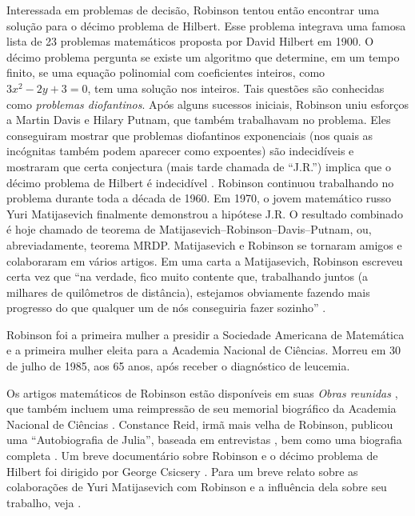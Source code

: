 \documentclass[../../../include/open-logic-section]{subfiles}
\begin{document}
Interessada em problemas de decisão, Robinson tentou então encontrar
uma solução para o décimo problema de Hilbert. Esse problema integrava
uma famosa lista de 23 problemas matemáticos proposta por David
Hilbert em 1900. O décimo problema pergunta se existe um algoritmo que
determine, em um tempo finito, se uma equação polinomial com
coeficientes inteiros, como $3x^2 - 2y +3 = 0$, tem uma solução nos
inteiros. Tais questões são conhecidas como \emph{problemas
diofantinos}. Após alguns sucessos iniciais, Robinson uniu esforços a
Martin Davis e Hilary Putnam, que também trabalhavam no problema. Eles
conseguiram mostrar que problemas diofantinos exponenciais (nos quais
as incógnitas também podem aparecer como expoentes) são indecidíveis
e mostraram que certa conjectura (mais tarde chamada de ``J.R.'')
implica que o décimo problema de Hilbert é indecidível
\citep{DavisPutnamRobinson1961}. Robinson continuou trabalhando no
problema durante toda a década de 1960. Em 1970, o jovem matemático
russo Yuri Matijasevich finalmente demonstrou a hipótese J.R. O
resultado combinado é hoje chamado de teorema de
Matijasevich--Robinson--Davis--Putnam, ou, abreviadamente, teorema
MRDP. Matijasevich e Robinson se tornaram amigos e colaboraram em
vários artigos. Em uma carta a Matijasevich, Robinson escreveu certa
vez que ``na verdade, fico muito contente que, trabalhando juntos (a
milhares de quilômetros de distância), estejamos obviamente fazendo
mais progresso do que qualquer um de nós conseguiria fazer sozinho''
\citep[45]{Matijasevich1992}.

Robinson foi a primeira mulher a presidir a Sociedade Americana de
Matemática e a primeira mulher eleita para a Academia Nacional de Ciências.
Morreu em 30 de julho de 1985, aos 65 anos, após receber o diagnóstico
de leucemia.

\begin{reading}
Os artigos matemáticos de Robinson estão disponíveis em suas
\textit{Obras reunidas} \citep{Robinson1996}, que também incluem uma
reimpressão de seu memorial biográfico da Academia Nacional de Ciências
\citep{Feferman1994}. Constance Reid, irmã mais velha de Robinson,
publicou uma ``Autobiografia de Julia'', baseada em entrevistas
\citep{Reid1986}, bem como uma biografia completa \citep{Reid1996}.
Um breve documentário sobre Robinson e o décimo problema de Hilbert
foi dirigido por George Csicsery \citep{Csicsery2016}. Para um breve
relato sobre as colaborações de Yuri Matijasevich com Robinson e a
influência dela sobre seu trabalho, veja \citep{Matijasevich1992}.
\end{reading}
\end{document}
